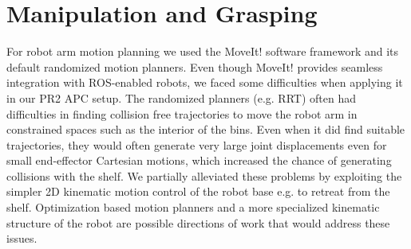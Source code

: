 \section{Manipulation and Grasping}
\label{sec:grasping}

For robot arm motion planning we used the MoveIt! software framework and its
default randomized motion planners. Even though MoveIt! provides seamless integration with ROS-enabled robots, we faced some difficulties when applying it in our PR2 APC setup. The randomized planners (e.g. RRT) often had difficulties in finding collision free trajectories
to move the robot arm in constrained spaces such as the interior of the bins. Even when it did find suitable trajectories, they would often  generate very large joint displacements even for small end-effector Cartesian motions, which 
increased the chance of generating collisions with the shelf. 
We partially alleviated these
problems by exploiting the simpler 2D kinematic motion control of the robot base e.g.
to retreat from the shelf. Optimization based motion planners and a more specialized
kinematic structure of the robot are possible directions of work that would address
these issues. 

